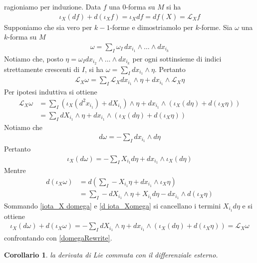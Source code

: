 \documentclass[twoside, 11pt]{amsbook}
\makeatletter
\newcommand{\0}{{(0)}}
\newcommand{\3}{{(3)}}
\theoremstyle{colonplain}
\newtheorem{cor}[thm]{Corollario}
\theoremstyle{colondefinition}
\theoremstyle{colonremark}
\numberwithin{equation}{chapter}
\renewcommand{\proofname}{Dimostrazione}
\renewenvironment{proof}[1][\proofname]{\par
  \pushQED{\qed}%
  \normalfont \topsep6\p@\@plus6\p@\relax
  \trivlist
  \item[\hskip\labelsep\bfseries #1:]\ignorespaces
}{%
  \popQED\endtrivlist\@endpefalse
}
\makeatother
\begin{document}
\begin{proof} ragioniamo per induzione. Data $f$ una $0$-forma su $M$ si ha
\begin{align}
    \iota_X(df) + d(\iota_X f) = \iota_X df = df(X) = \mathcal{L}_X f
\end{align}
Supponiamo che sia vero per $k - 1$-forme e dimostriamolo per $k$-forme. Sia $\omega$ una $k$-forma su $M$
\begin{align}
    \omega = \sum_I \omega_I \, dx_{i_1} \wedge \dots \wedge dx_{i_k} 
\end{align}
Notiamo che, posto $\eta = \omega_I dx_{i_2} \wedge \dots \wedge dx_{i_k}$ per ogni sottinsieme di indici strettamente crescenti di $I$, si ha $\omega = \sum_I dx_{i_1} \wedge \eta$. Pertanto
\begin{align}
    \mathcal{L}_X \omega = \sum_I \mathcal{L}_X dx_{i_1} \wedge \eta + dx_{i_1} \wedge \mathcal{L}_X \eta
\end{align}
Per ipotesi induttiva si ottiene
\begin{align}
    \mathcal{L}_X \omega &= \sum_I (\iota_X(d^2x_{i_1}) + dX_{i_1}) \wedge \eta + dx_{i_1} \wedge (\iota_X(d\eta) + d(\iota_X \eta)) \\
    &= \sum_I dX_{i_1} \wedge \eta + dx_{i_1} \wedge (\iota_X(d\eta) + d(\iota_X\eta))
\end{align}
Notiamo che
\begin{align}\label{domegaRewrite}
    d\omega = -\sum_I dx_{i_1} \wedge d\eta
\end{align}
Pertanto
\begin{align}\label{iota_X domega}
    \iota_X(d\omega) = -\sum_I X_{i_1}d\eta + dx_{i_1} \wedge \iota_X(d\eta)
\end{align}
Mentre
\begin{align}\label{d iota_Xomega}
    d(\iota_X \omega) &= d\left(\sum_I -X_{i_1}\eta + dx_{i_1} \wedge \iota_X\eta\right) \\
    &= \sum_I -dX_{i_1} \wedge \eta + X_{i_1}d\eta - dx_{i_1} \wedge d(\iota_X \eta)
\end{align}
Sommando \eqref{iota_X domega} e \eqref{d iota_Xomega} si cancellano i termini $X_{i_1}d\eta$ e si ottiene
\begin{align}
    \iota_X(d\omega) + d(\iota_X\omega) = -\sum_I dX_{i_1} \wedge \eta + dx_{i_1} \wedge (\iota_X(d\eta) + d(\iota_X\eta)) = \mathcal{L}_X\omega
\end{align}
confrontando con \eqref{domegaRewrite}.
\end{proof}
\begin{cor} la derivata di Lie commuta con il differenziale esterno.
\end{cor}
\end{document}
